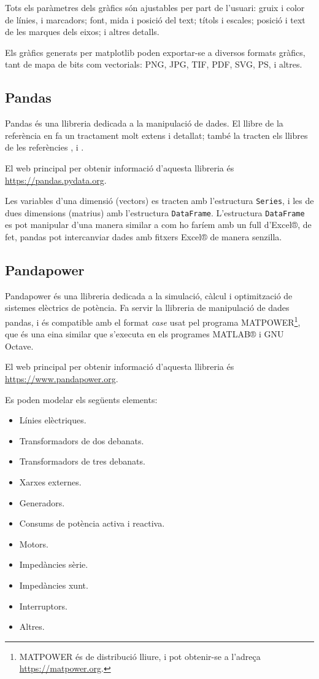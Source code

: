 Tots els paràmetres dels gràfics són ajustables per part de l'usuari: gruix i color de línies, i marcadors; font, mida i posició  del text;  títols i escales; posició i text de les marques dels eixos; i altres detalls.

Els gràfics generats per matplotlib poden exportar-se a diversos formats gràfics, tant de mapa de bits com vectorials: PNG, JPG, TIF, PDF, SVG, PS, i altres.



\subsection{Pandas}

Pandas és una llibreria dedicada a la manipulació de dades.  El llibre de la referència \cite{VAN} en fa un tractament molt extens i detallat; també la tracten els llibres de les referències \cite{JOH}, \cite{HIL} i \cite{ZUM}.


El  web principal per obtenir informació d'aquesta llibreria és \href{https://pandas.pydata.org/}{https:/\!\!/pandas.pydata.org}.

Les variables d'una dimensió (vectors) es tracten amb l'estructura \texttt{Series}, i les de dues dimensions (matrius) amb l'estructura \texttt{DataFrame}. L'estructura \texttt{DataFrame} es pot manipular d'una manera similar a com ho faríem amb un full d'Excel®, de fet, pandas pot intercanviar dades amb fitxers Excel® de manera senzilla.


\subsection{Pandapower}

Pandapower és una llibreria dedicada a la simulació, càlcul i optimització de sistemes elèctrics de potència.  Fa servir la llibreria de manipulació de dades pandas, i és compatible amb el format \textit{case} usat pel programa MATPOWER\footnote{MATPOWER és de distribució lliure, i pot obtenir-se a l'adreça \href{https://matpower.org/}{https:/\!\!/matpower.org}.}, que és una eina similar que s'executa en els programes MATLAB® i GNU Octave.

El  web principal per obtenir informació d'aquesta llibreria és \href{https://www.pandapower.org/}{https:/\!\!/www.pandapower.org}.

Es poden modelar els següents elements:
\begin{itemize}
	\item Línies elèctriques.
	\item Transformadors de dos debanats.
	\item Transformadors de tres debanats.
	\item Xarxes externes.
	\item Generadors.
	\item Consums de potència activa i reactiva.
	\item Motors.
	\item Impedàncies sèrie.
	\item Impedàncies xunt.
	\item Interruptors.
	\item Altres.
\end{itemize}

